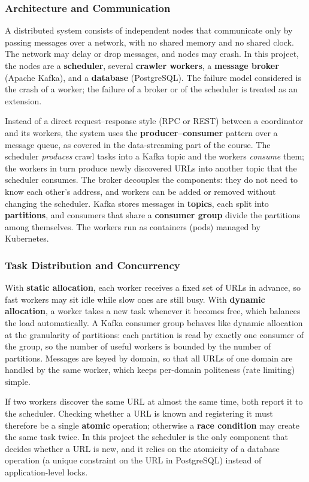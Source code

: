 \subsubsection{Architecture and Communication}
A distributed system consists of independent nodes that communicate only by passing messages over a network, with no shared memory and no shared clock. The network may delay or drop messages, and nodes may crash. In this project, the nodes are a \textbf{scheduler}, several \textbf{crawler workers}, a \textbf{message broker} (Apache Kafka), and a \textbf{database} (PostgreSQL). The failure model considered is the crash of a worker; the failure of a broker or of the scheduler is treated as an extension.

Instead of a direct request--response style (RPC or REST) between a coordinator and its workers, the system uses the \textbf{producer--consumer} pattern over a message queue, as covered in the data-streaming part of the course. The scheduler \emph{produces} crawl tasks into a Kafka topic and the workers \emph{consume} them; the workers in turn produce newly discovered URLs into another topic that the scheduler consumes. The broker decouples the components: they do not need to know each other's address, and workers can be added or removed without changing the scheduler. Kafka stores messages in \textbf{topics}, each split into \textbf{partitions}, and consumers that share a \textbf{consumer group} divide the partitions among themselves. The workers run as containers (pods) managed by Kubernetes.


\subsubsection{Task Distribution and Concurrency}
With \textbf{static allocation}, each worker receives a fixed set of URLs in advance, so fast workers may sit idle while slow ones are still busy. With \textbf{dynamic allocation}, a worker takes a new task whenever it becomes free, which balances the load automatically. A Kafka consumer group behaves like dynamic allocation at the granularity of partitions: each partition is read by exactly one consumer of the group, so the number of useful workers is bounded by the number of partitions. Messages are keyed by domain, so that all URLs of one domain are handled by the same worker, which keeps per-domain politeness (rate limiting) simple.

If two workers discover the same URL at almost the same time, both report it to the scheduler. Checking whether a URL is known and registering it must therefore be a single \textbf{atomic} operation; otherwise a \textbf{race condition} may create the same task twice. In this project the scheduler is the only component that decides whether a URL is new, and it relies on the atomicity of a database operation (a unique constraint on the URL in PostgreSQL) instead of application-level locks.



